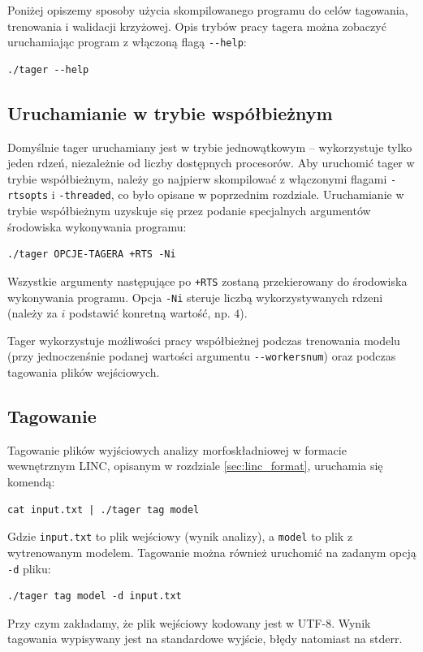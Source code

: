 \documentclass[a4paper,10]{article}
\begin{document}
Poniżej opiszemy sposoby użycia skompilowanego programu do celów
tagowania, trenowania i walidacji krzyżowej. Opis trybów
pracy tagera można zobaczyć uruchamiając program z włączoną
flagą \verb|--help|:
\begin{verbatim}
./tager --help
\end{verbatim}

\subsection{Uruchamianie w trybie współbieżnym}

Domyślnie tager uruchamiany jest w trybie jednowątkowym -- wykorzystuje
tylko jeden rdzeń, niezależnie od liczby dostępnych procesorów.
Aby uruchomić tager w trybie współbieżnym, należy go najpierw skompilować
z włączonymi flagami \verb|-rtsopts| i \verb|-threaded|, co było
opisane w poprzednim rozdziale.
Uruchamianie w trybie współbieżnym uzyskuje się przez podanie specjalnych
argumentów środowiska wykonywania programu:
\begin{verbatim}
./tager OPCJE-TAGERA +RTS -Ni
\end{verbatim}
Wszystkie argumenty następujące po \verb|+RTS| zostaną przekierowany
do środowiska wykonywania programu. Opcja \verb|-Ni| steruje
liczbą wykorzystywanych rdzeni (należy za $i$ podstawić konretną wartość,
np. $4$).

Tager wykorzystuje możliwości pracy współbieżnej podczas
trenowania modelu (przy jednoczenśnie podanej wartości
argumentu \verb|--workersnum|) oraz podczas tagowania
plików wejściowych.

\subsection{Tagowanie}

Tagowanie plików wyjściowych analizy morfoskładniowej w formacie
wewnętrznym LINC, opisanym w rozdziale \ref{sec:linc_format},
uruchamia się komendą:
\begin{verbatim}
cat input.txt | ./tager tag model
\end{verbatim}
Gdzie \verb|input.txt| to plik wejściowy (wynik analizy),
a \verb|model| to plik z wytrenowanym modelem.
Tagowanie można również uruchomić na zadanym opcją \verb|-d| pliku:
\begin{verbatim}
./tager tag model -d input.txt
\end{verbatim}
Przy czym zakładamy, że plik wejściowy kodowany jest w UTF-8.
Wynik tagowania wypisywany jest na standardowe wyjście, błędy
natomiast na stderr.
\end{document}
